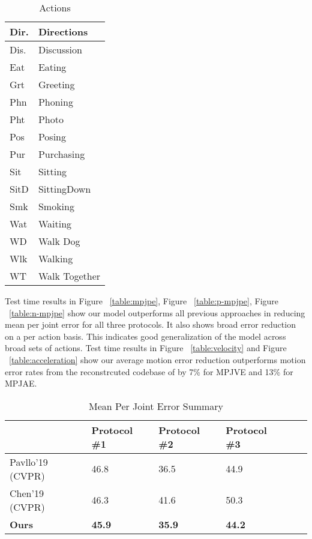 \documentclass[runningheads]{llncs}
\begin{document}
\begin{table}
\caption{Actions}
\begin{center}
\small
\begin{tabular}{|l|l|}
\hline
Dir. & Directions \\ \hline 
Dis. & Discussion \\ \hline 
Eat  & Eating \\ \hline 
Grt & Greeting \\ \hline 
Phn & Phoning \\ \hline 
Pht & Photo \\ \hline 
Pos & Posing \\ \hline
Pur & Purchasing \\ \hline
Sit & Sitting \\ \hline
SitD & SittingDown \\ \hline
Smk & Smoking \\ \hline
Wat & Waiting \\ \hline
WD & Walk Dog \\ \hline
Wlk & Walking \\ \hline
WT & Walk Together \\ \hline
\end{tabular}
\end{center}
\label{fig:actions}
\end{table}

Test time results in Figure ~\ref{table:mpjpe}, Figure ~\ref{table:p-mpjpe}, Figure ~\ref{table:n-mpjpe} show our model outperforms all previous approaches in reducing mean per joint error for all three protocols. It also shows broad error reduction on a per action basis. This indicates good generalization of the model across broad sets of actions.  Test time results in Figure ~\ref{table:velocity} and Figure ~\ref{table:acceleration} show our average motion error reduction outperforms motion error rates from the reconstrcuted codebase of \cite{pavllo20193d} by 7\% for MPJVE and 13\% for MPJAE.

\begin{table}
\caption{Mean Per Joint Error Summary}
\begin{center}



\small
\begin{tabular}{|l|l|l|l|l|l|}\hline
& Protocol \#1 & Protocol \#2 & Protocol \#3 \\ \hline
Pavllo'19 (CVPR) & 46.8 & 36.5 & 44.9 \\ \hline
Chen'19 (CVPR) & 46.3 & 41.6 & 50.3 \\ \hline
\textbf{Ours} & \textbf{45.9} & \textbf{35.9} & \textbf{44.2}\\ \hline
\end{tabular}
\end{center}
\label{table::mpjpe-summary}
\end{table}
\end{document}
